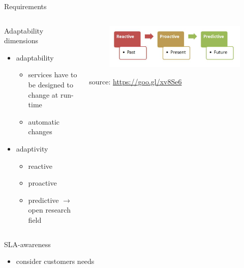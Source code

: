 \begin{frame}{Requirements}
{\begin{columns}
\begin{column}{0.35\textwidth}
			\end{column}
		\end{columns}
	}
	{
		\begin{columns}
			\begin{column}{0.6\textwidth}
				Adaptability dimensions
				\begin{itemize}
					\item{\footnotesize{adaptability}}
					\begin{itemize}
						\item{\scriptsize{services have to be designed to change at run-time}}
						\item{\scriptsize{automatic changes}}
					\end{itemize}
					\item{\footnotesize{adaptivity}}
					\begin{itemize}
						\item{\scriptsize{reactive}}
						\item{\scriptsize{proactive}}
						\item{\scriptsize{predictive $\rightarrow{}$ open research field}}
					\end{itemize}
				\end{itemize}
			\end{column}
			\begin{column}{0.4\textwidth}
				\begin{figure}
					\centering{}
					\includegraphics[scale=0.18]{images/adaptability.png}
				\end{figure}
				\begin{flushright}
					\tiny{source: \url{https://goo.gl/xv8Se6}}
				\end{flushright}
			\end{column}
		\end{columns}
	}
	\only<5>
	{
		\begin{columns}
			\begin{column}{0.55\textwidth}
				SLA-awareness
				\begin{itemize}
					\item{\footnotesize{consider customers needs}}

\end{itemize}
\end{column}
\end{columns}}
\end{frame}
